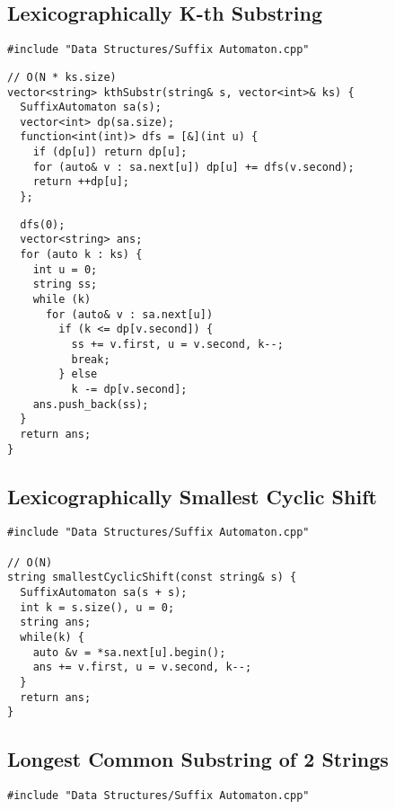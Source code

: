 \documentclass[twoside]{article}
\newcommand{\fileTitleStyle}{\large\underline}
\begin{document}
\begin{multicols*}{2}
\subsection*{Lexicographically K-th Substring}
\begin{verbatim}
#include "Data Structures/Suffix Automaton.cpp"
\end{verbatim}
\vspace{-12pt}
\begin{verbatim}
// O(N * ks.size)
vector<string> kthSubstr(string& s, vector<int>& ks) {
  SuffixAutomaton sa(s);
  vector<int> dp(sa.size);
  function<int(int)> dfs = [&](int u) {
    if (dp[u]) return dp[u];
    for (auto& v : sa.next[u]) dp[u] += dfs(v.second);
    return ++dp[u];
  };
\end{verbatim}
\vspace{-12pt}
\begin{verbatim}
  dfs(0);
  vector<string> ans;
  for (auto k : ks) {
    int u = 0;
    string ss;
    while (k)
      for (auto& v : sa.next[u])
        if (k <= dp[v.second]) {
          ss += v.first, u = v.second, k--;
          break;
        } else
          k -= dp[v.second];
    ans.push_back(ss);
  }
  return ans;
}
\end{verbatim}

\subsectionfont{\centering\bfseries\LARGE}
\subsectionfont{\fileTitleStyle}
\subsection*{Lexicographically Smallest Cyclic Shift}
\begin{verbatim}
#include "Data Structures/Suffix Automaton.cpp"

// O(N)
string smallestCyclicShift(const string& s) {
  SuffixAutomaton sa(s + s);
  int k = s.size(), u = 0;
  string ans;
  while(k) {
    auto &v = *sa.next[u].begin();
    ans += v.first, u = v.second, k--;
  }
  return ans;
}
\end{verbatim}

\subsectionfont{\centering\bfseries\LARGE}
\subsectionfont{\fileTitleStyle}
\subsection*{Longest Common Substring of 2 Strings}
\begin{verbatim}
#include "Data Structures/Suffix Automaton.cpp"


\end{verbatim}
\end{multicols*}
\end{document}
